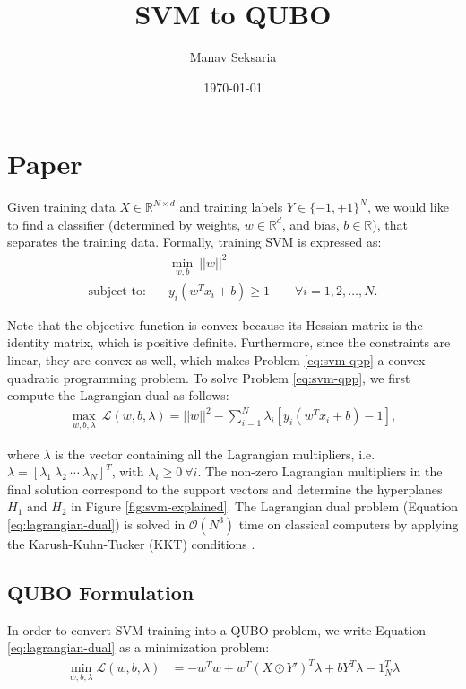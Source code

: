\documentclass[12pt]{article}
\title{SVM to QUBO}
\author{Manav Seksaria}
\date{\today}
\numberwithin{equation}{section}
\begin{document}
\maketitle

\section{Paper}
Given training data $X \in \mathbb{R}^{N \times d}$ and training labels $Y \in \{-1, +1\}^N$, we would like to find a classifier (determined by weights, $w \in \mathbb{R}^d$, and bias, $b \in \mathbb{R}$), that separates the training data.
Formally, training SVM is expressed as:
\begin{align}
    & \min_{w, b} \ ||w||^2 \label{eq:svm-qpp} \\
    \text{subject to:} \quad & y_i (w^T x_i + b) \ge 1 \qquad \forall i = 1, 2, \ldots, N \nonumber.
\end{align}

Note that the objective function is convex because its Hessian matrix is the identity matrix, which is positive definite.
Furthermore, since the constraints are linear, they are convex as well, which makes Problem \ref{eq:svm-qpp} a convex quadratic programming problem.
To solve Problem \ref{eq:svm-qpp}, we first compute the Lagrangian dual as follows:
\begin{align}
    \max_{w, b, \lambda} \ \mathcal{L}(w, b, \lambda) = ||w||^2 - \sum_{i = 1}^{N} \lambda_i \left[ y_i (w^T x_i + b) - 1 \right], \label{eq:lagrangian-dual}
\end{align}

where $\lambda$ is the vector containing all the Lagrangian multipliers, i.e. $\lambda = [\lambda_1 \ \lambda_2 \ \cdots \ \lambda_N]^T$, with $\lambda_i \ge 0 \ \forall i$.
The non-zero Lagrangian multipliers in the final solution correspond to the support vectors and determine the hyperplanes $H_1$ and $H_2$ in Figure \ref{fig:svm-explained}.
The Lagrangian dual problem (Equation \ref{eq:lagrangian-dual}) is solved in $\mathcal{O}(N^3)$ time on classical computers by applying the Karush-Kuhn-Tucker (KKT) conditions \cite{karush1939minima,kuhn2014nonlinear}.


\subsection{QUBO Formulation}
\label{sub:svm-formulation}
In order to convert SVM training into a QUBO problem, we write Equation \ref{eq:lagrangian-dual} as a minimization problem:
\begin{align}
    \min_{w, b, \lambda} \mathcal{L}(w, b, \lambda) &= - w^T w + w^T (X \odot Y')^T \lambda + b Y^T \lambda - 1_{N}^T \lambda \label{eq:lagrangian-dual-min}
\end{align}
\end{document}
